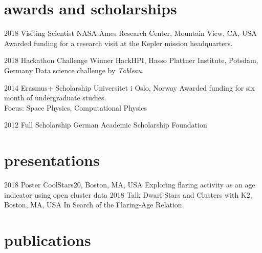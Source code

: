 \documentclass[]{k-cv} %
\begin{document}

\section{awards and scholarships}

\begin{entrylist}
\entry
{2018}
{Visiting Scientist}
{NASA Ames Research Center, Mountain View, CA, USA}
{Awarded funding for a research visit at the Kepler mission headquarters.}

\entry
{2018}
{Hackathon Challenge Winner}
{HackHPI, Hasso Plattner Institute, Potsdam, Germany}
{Data science challenge by \emph{Tableau}.}

\entry
{2014}
{Erasmus+ Scholarship}
{Universitet i Oslo, Norway}
{Awarded funding for six month of undergraduate studies.\\
Focus: Space Physics, Computational Physics}

\entry
{2012 }
{Full Scholarship}
{German Academic Scholarship Foundation}


\end{entrylist}

\clearpage



\section{presentations}

\begin{entrylist}
\entry
{2018}
{Poster}
{CoolStars20, Boston, MA, USA}
{Exploring flaring activity as an age indicator using open cluster data}
\entry
{2018}
{Talk}
{Dwarf Stars and Clusters with K2, Boston, MA, USA}
{In Search of the Flaring-Age Relation.}
\end{entrylist}


\section{publications}
\end{document}
